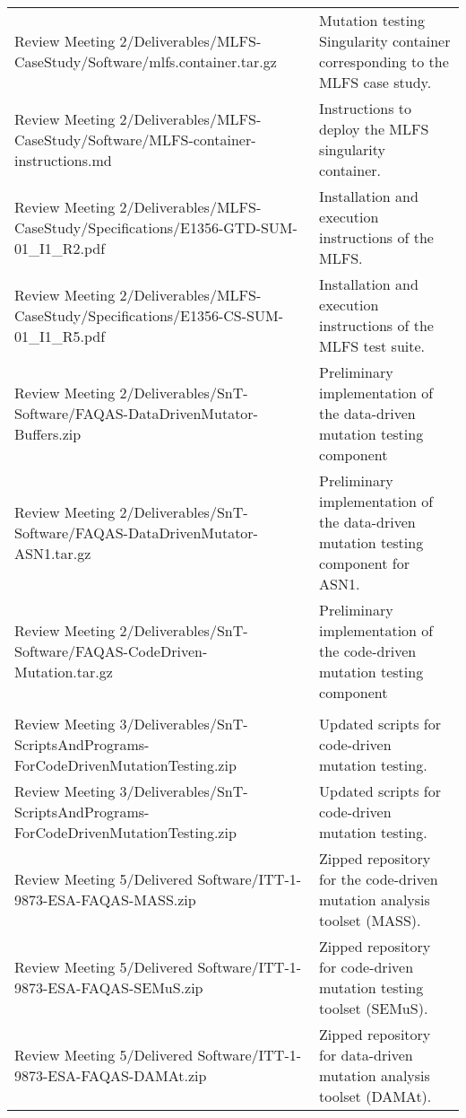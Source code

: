 \begin{longtable}{|p{8cm}|p{8cm}@{}|}
\hline
 Review Meeting 2/Deliverables/MLFS-CaseStudy/Software/mlfs.container.tar.gz&Mutation testing Singularity container corresponding to the MLFS case study.\\
 Review Meeting 2/Deliverables/MLFS-CaseStudy/Software/MLFS-container-instructions.md&Instructions to deploy the MLFS singularity container.\\
 Review Meeting 2/Deliverables/MLFS-CaseStudy/Specifications/E1356-GTD-SUM-01\_I1\_R2.pdf&Installation and execution instructions of the MLFS.\\
 Review Meeting 2/Deliverables/MLFS-CaseStudy/Specifications/E1356-CS-SUM-01\_I1\_R5.pdf&Installation and execution instructions of the MLFS test suite.\\
\hline
 Review Meeting 2/Deliverables/SnT-Software/FAQAS-DataDrivenMutator-Buffers.zip&Preliminary implementation of the data-driven mutation testing component\\
 Review Meeting 2/Deliverables/SnT-Software/FAQAS-DataDrivenMutator-ASN1.tar.gz&Preliminary implementation of the data-driven mutation testing component for ASN1.\\
 Review Meeting 2/Deliverables/SnT-Software/FAQAS-CodeDriven-Mutation.tar.gz&Preliminary implementation of the code-driven mutation testing component\\
\\
\hline
 Review Meeting 3/Deliverables/SnT-ScriptsAndPrograms-ForCodeDrivenMutationTesting.zip&Updated scripts for code-driven mutation testing.\\
\hline
\hline
 Review Meeting 3/Deliverables/SnT-ScriptsAndPrograms-ForCodeDrivenMutationTesting.zip&Updated scripts for code-driven mutation testing.\\
\hline
Review Meeting 5/Delivered Software/ITT-1-9873-ESA-FAQAS-MASS.zip&Zipped repository for the code-driven mutation analysis toolset (MASS).\\
Review Meeting 5/Delivered Software/ITT-1-9873-ESA-FAQAS-SEMuS.zip&Zipped repository for code-driven mutation testing toolset (SEMuS).\\
Review Meeting 5/Delivered Software/ITT-1-9873-ESA-FAQAS-DAMAt.zip&Zipped repository for data-driven mutation analysis toolset (DAMAt).\\
\hline

                                                    
\end{longtable}
\normalsize

\clearpage